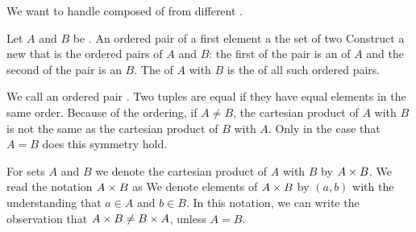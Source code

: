 
\sbasic



\sstart



We want to handle 
composed of  from
different .


Let $A$ and $B$ be .
An ordered pair of a first element a the set of two
Construct a new  that is the
ordered pairs of 
$A$ and $B$: the first 
of the pair is an  of
$A$ and the second  of
the pair is an  $B$.
The 
of $A$ with $B$ is the  of all
such ordered pairs.

We call an ordered pair .
Two tuples are equal if they have equal elements in the same order.
Because of the ordering, if $A \neq B$, the cartesian product of $A$ with $B$
is not the same as the cartesian product of $B$ with $A$.
Only in the case that $A = B$ does this symmetry hold.

For sets $A$ and $B$ we denote the cartesian product of
$A$ with $B$ by $A \times B$.
We read the notation $A \times B$ as 
We denote elements of $A \times B$ by $(a, b)$ with the
understanding that $a \in A$ and $b \in B$.
In this notation, we can write the observation that
$A \times B \neq B \times A$, unless $A = B$.

\strats
